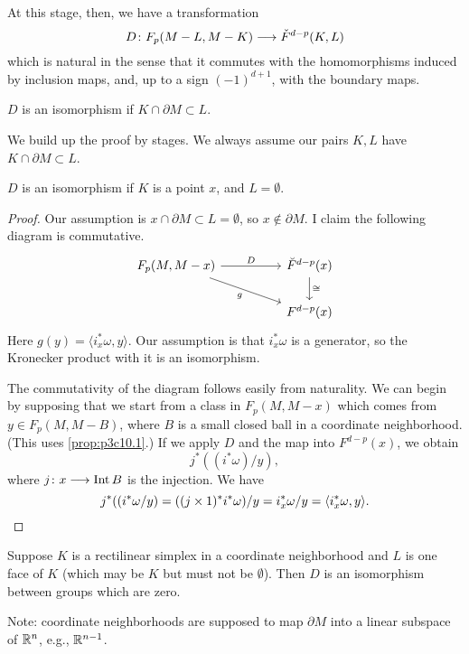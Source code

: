 \documentclass[../main]{subfiles}
\begin{document}
At this stage, then, we have a transformation
\[D \colon F_p(M-L,M-K) \longrightarrow \check{F}^{d-p}(K,L)\]
which is natural in the sense that it commutes with the homomorphisms induced by inclusion maps, and, up to a sign $(-1)^{d+1}$, with the boundary maps.
\begin{theorem}\label{thm:p3c10.6}
$D$ is an isomorphism if $K \cap \partial M \subset L$.
\end{theorem}
We build up the proof by stages. We always assume our pairs $K,L$ have $K \cap \partial M \subset L$.
\begin{remark}\label{rmk:p3c10.7}
$D$ is an isomorphism if $K$ is a point $x$, and $L = \emptyset$.
\end{remark}
\begin{proof}
Our assumption is $x \cap \partial M \subset L = \emptyset$, so $x \not\in \partial M$. I claim the following diagram is commutative.
\[
\begin{tikzcd}
{F_p(M, M - x)} \arrow[rrd, "g"'] \arrow[rr, "D"] &  & \breve F^{d - p}(x) \arrow[d, "\cong"] \\
                                                  &  & F^{d - p}(x)                          
\end{tikzcd}
\]
Here $g(y) = \langle i_x^* \omega, y \rangle$. Our assumption is that $i_x^* \omega$ is a generator, so the Kronecker product with it is an isomorphism.

The commutativity of the diagram follows easily from naturality. We can begin by supposing that we start from a class in $F_p(M,M-x)$ which comes from $y \in F_p(M,M-B)$, where $B$ is a small closed ball in a coordinate neighborhood. (This uses \ref{prop:p3c10.1}.) If we apply $D$ and the map into $F^{d-p}(x)$, we obtain
\[j^*((i^* \omega)/y),\]
where $j \colon x \longrightarrow \operatorname{Int} B$ is the injection. We have
\[
	j^*((i^*\omega/y) = ((j \times 1)^* i^* \omega)/y = i_x^*\omega/y = \langle i_x^* \omega, y \rangle. \qedhere
\]
\end{proof}
\begin{remark}\label{rmk:p3c10.8}
Suppose $K$ is a rectilinear simplex in a coordinate neighborhood and $L$ is one face of $K$ (which may be $K$ but must not be $\emptyset$). Then $D$ is an isomorphism between groups which are zero.
\end{remark}
Note: coordinate neighborhoods are supposed to map $\partial M$ into a linear subspace of $\mathbb{R}^n$, e.g., $\mathbb{R}^{n-1}$.
\end{document}
